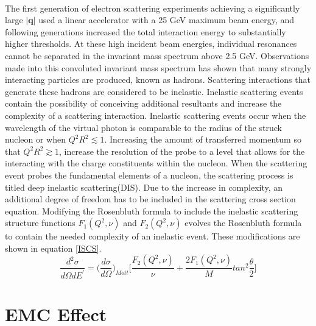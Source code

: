 \paragraph{}The first generation of electron scattering experiments achieving a significantly large  $|\boldsymbol{q}|$ used a linear accelerator with a 25 GeV maximum beam energy, and following generations increased the total interaction energy to substantially higher thresholds. At these high incident beam energies, individual resonances cannot be separated in the invariant mass spectrum above 2.5 GeV. Observations made into this convoluted invariant mass spectrum has shown that many strongly interacting particles are produced, known as hadrons. Scattering interactions that generate these hadrons are considered to be inelastic. Inelastic scattering events contain the possibility of conceiving additional resultants and increase the complexity of a scattering interaction. Inelastic scattering events occur when the wavelength of the virtual photon is comparable to the radius of the struck nucleon or when $Q^2R^2 \lesssim 1$\cite{PnN}. Increasing the amount of transferred momentum so that $Q^2R^2 \gtrsim 1$, increase the resolution of the probe to a level that allows for the interacting with the charge constituents within the nucleon. When the scattering event probes the fundamental elements of a nucleon, the scattering process is titled deep inelastic scattering(DIS). Due to the increase in complexity, an additional degree of freedom has to be included in the scattering cross section equation. Modifying the Rosenbluth formula to include the inelastic scattering structure functions $F_1(Q^2,\nu)$ and $F_2(Q^2,\nu)$ evolves the Rosenbluth formula to contain the needed complexity of an inelastic event. These modifications are shown in equation \ref{ISCS}.
\begin{equation}
\label{ISCS}
\frac{d^2\sigma}{d\Omega dE^\prime}=\bigg(\frac{d\sigma}{d\Omega}\bigg)_{Mott} \bigg\lbrack \frac{F_2(Q^2,\nu)}{\nu} + \frac{2F_1(Q^2,\nu)}{M}tan^2\frac{\theta}{2} \bigg \rbrack
\end{equation}  


	\cite{DISearly}
	\cite{DISproton}

	
\section{EMC Effect}

